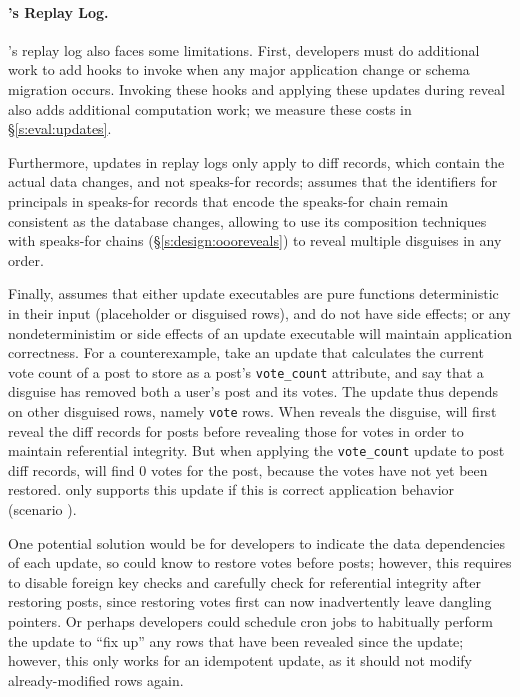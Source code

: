 \paragraph{\sys's Replay Log.}
\label{s:design:updates:limitations}
\sys's replay log also faces some limitations.
%
First, developers must do additional work to add hooks to invoke \sys when any
major application change or schema migration occurs. 
%
Invoking these hooks and applying these updates during reveal also adds
additional computation work; we measure these costs in \S\ref{s:eval:updates}.
%

%
Furthermore, updates in replay logs only apply to diff records, which contain the actual
data changes, and not speaks-for records; \sys assumes that the identifiers for
principals in speaks-for records that encode the speaks-for chain remain
consistent as the database changes, allowing \sys to use its composition
techniques with speaks-for chains (\S\ref{s:design:oooreveals}) to reveal
multiple disguises in any order.
%

%
Finally, \sys assumes that either \one{} update executables are pure functions
deterministic in their input (placeholder or disguised rows), and do not have
side effects; or \two{} any nondeterministim or side effects of an update
executable will maintain application correctness.
%
For a counterexample, take an update that calculates the current vote count of a
post to store as a post's \texttt{vote\_count} attribute, and say that a
disguise has removed both a user's post and its votes.
%
The update thus depends on other disguised rows, namely \texttt{vote} rows.
%
When \sys reveals the disguise, \sys will first reveal the diff records for
posts before revealing those for votes in order to maintain referential
integrity. But when applying the \texttt{vote\_count} update to post diff
records, \sys will find 0 votes for the post, because the votes have not yet
been restored.
%
\sys only supports this update if this is correct application behavior (scenario
\two{}).
%

%
One potential solution would be for developers to indicate the data dependencies
of each update, so \sys could know to restore votes before posts; however, this
requires \sys to disable foreign key checks and carefully check for referential
integrity after restoring posts, since restoring votes first can now
inadvertently leave dangling pointers. Or perhaps developers could schedule cron
jobs to habitually perform the update to ``fix up'' any rows that have been
revealed since the update; however, this only works for an idempotent update, as
it should not modify already-modified rows again.  
%

